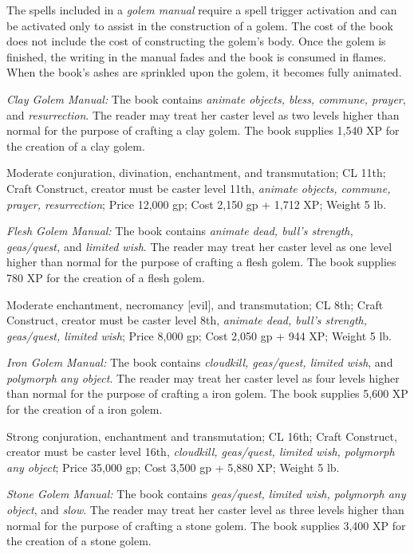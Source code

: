 The spells included in a \textit{golem manual }require a spell trigger activation 
and can be activated only to assist in the construction of a golem. The cost of 
the book does not include the cost of constructing the golem's body. Once the golem 
is finished, the writing in the manual fades and the book is consumed in flames. 
When the book's ashes are sprinkled upon the golem, it becomes fully animated.

\textit{Clay Golem Manual: }The book contains \textit{animate objects, bless, commune, 
prayer}, and \textit{resurrection}. The reader may treat her caster level as two 
levels higher than normal for the purpose of crafting a clay golem. The book supplies 
1,540 XP for the creation of a clay golem.

Moderate conjuration, divination, enchantment, and transmutation; CL 11th; Craft 
Construct, creator must be caster level 11th, \textit{animate objects, commune, 
prayer, resurrection}; Price 12,000 gp; Cost 2,150 gp + 1,712 XP; Weight 5 lb.

\textit{Flesh Golem Manual: }The book contains \textit{animate dead, bull's strength, 
geas/quest, }and \textit{limited wish}. The reader may treat her caster level as 
one level higher than normal for the purpose of crafting a flesh golem. The book 
supplies 780 XP for the creation of a flesh golem.

Moderate enchantment, necromancy [evil], and transmutation; CL 8th; Craft Construct, 
creator must be caster level 8th, \textit{animate dead, bull's strength, geas/quest, 
limited wish}; Price 8,000 gp; Cost 2,050 gp + 944 XP; Weight 5 lb.

\textit{Iron Golem Manual: }The book contains \textit{cloudkill, geas/quest, limited 
wish}, and \textit{polymorph any object}. The reader may treat her caster level 
as four levels higher than normal for the purpose of crafting a iron golem. The 
book supplies 5,600 XP for the creation of a iron golem.

Strong conjuration, enchantment and transmutation; CL 16th; Craft Construct, creator 
must be caster level 16th, \textit{cloudkill, geas/quest, limited wish, polymorph 
any object}; Price 35,000 gp; Cost 3,500 gp + 5,880 XP; Weight 5 lb.

\textit{Stone Golem Manual: }The book contains \textit{geas/quest, limited wish, 
polymorph any object}, and \textit{slow}. The reader may treat her caster level 
as three levels higher than normal for the purpose of crafting a stone golem. The 
book supplies 3,400 XP for the creation of a stone golem.

